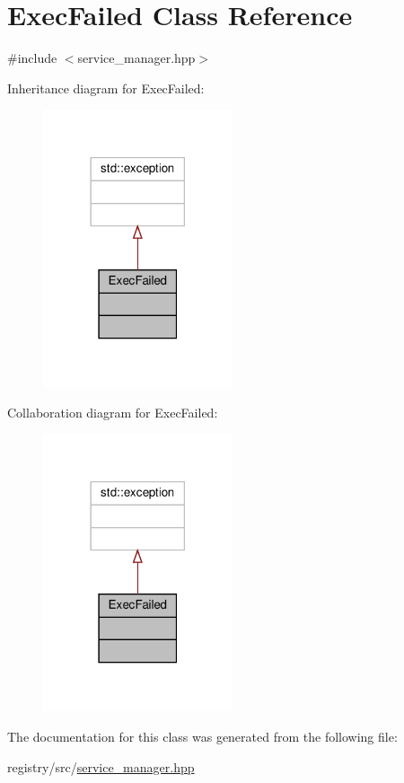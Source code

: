 \hypertarget{classExecFailed}{}\section{Exec\+Failed Class Reference}
\label{classExecFailed}


{\ttfamily \#include $<$service\+\_\+manager.\+hpp$>$}



Inheritance diagram for Exec\+Failed\+:
\nopagebreak
\begin{figure}[H]
\begin{center}
\leavevmode
\includegraphics[width=158pt]{classExecFailed__inherit__graph}
\end{center}
\end{figure}


Collaboration diagram for Exec\+Failed\+:
\nopagebreak
\begin{figure}[H]
\begin{center}
\leavevmode
\includegraphics[width=158pt]{classExecFailed__coll__graph}
\end{center}
\end{figure}


The documentation for this class was generated from the following file\+:\begin{DoxyCompactItemize}
\item 
registry/src/\hyperlink{service__manager_8hpp}{service\+\_\+manager.\+hpp}\end{DoxyCompactItemize}
